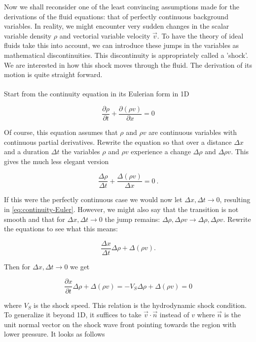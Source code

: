 Now we shall reconsider one of the least convincing assumptions made for the derivations of the fluid equations: that of perfectly continuous background variables. In reality, we might encounter very sudden changes in the scalar variable density $\rho$ and vectorial variable velocity $\vec{v}$. To have the theory of ideal fluids take this into account, we can introduce these jumps in the variables as mathematical discontinuities. This discontinuity is appropriately called a 'shock'. We are interested in how this shock moves through the fluid. The derivation of its motion is quite straight forward.\\
\\
Start from the continuity equation in its Eulerian form in 1D

\begin{equation}
\label{eq:continuity-Euler}
\frac{\partial \rho}{\partial t} + \frac{\partial(\rho v)}{\partial x} = 0
\end{equation}

Of course, this equation assumes that $\rho$ and $\rho v$ are continuous variables with continuous partial derivatives. Rewrite the equation so that over a distance $\Delta x$ and a duration $\Delta t$ the variables $\rho$ and $\rho v$ experience a change $\Delta\rho$ and $\Delta \rho v$. This gives the much less elegant version 

$$ \frac{\Delta \rho}{\Delta t} + \frac{\Delta(\rho v)}{\Delta x} = 0 \ . $$

If this were the perfectly continuous case we would now let $\Delta x, \Delta t \to 0$, resulting in \cref{eq:continuity-Euler}. However, we might also say that the transition is not smooth and that for $\Delta x, \Delta t \to 0$ the jump remains: $ \Delta \rho, \Delta \rho v \to \Delta \rho, \Delta \rho v $. Rewrite the equations to see what this means:

$$ \frac{\Delta x}{\Delta t} \Delta \rho + \Delta(\rho v) . $$

Then for $\Delta x, \Delta t \to 0$ we get 

\begin{equation}
\label{eq:HD-shock-condition}
\frac{\partial x}{\partial t} \Delta \rho + \Delta(\rho v) = -V_S \Delta \rho + \Delta(\rho v) = 0
\end{equation}

where $V_S$ is the shock speed. This relation is the hydrodynamic shock condition. To generalize it beyond 1D, it suffices to take $\vec{v} \cdot \vec{n}$ instead of $v$ where $\vec{n}$ is the unit normal vector on the shock wave front pointing towards the region with lower pressure. It looks as follows

